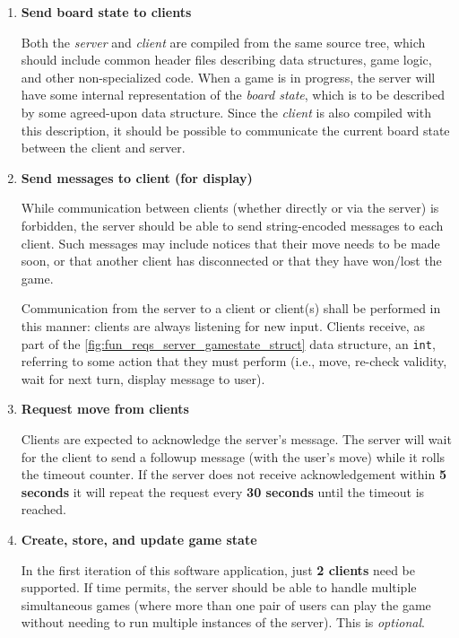 \documentclass[letterpaper]{article}
\begin{document}
\begin{enumerate}
    \item \textbf{Send board state to clients}
    
          Both the \emph{server} and \emph{client} are compiled
          from the same source tree, which should include common
          header files describing data structures, game logic,
          and other non-specialized code. When a game is in
          progress, the server will have some internal
          representation of the \emph{board state}, which is to
          be described by some agreed-upon data structure. Since
          the \emph{client} is also compiled with this
          description, it should be possible to communicate the
          current board state between the client and server.
          
    \item \textbf{Send messages to client (for display)}
    
          While communication between clients (whether directly
          or via the server) is forbidden, the server should be
          able to send string-encoded messages to each client.
          Such messages may include notices that their move
          needs to be made soon, or that another client has
          disconnected or that they have won/lost the game.
          
          Communication from the server to a client or client(s)
          shall be performed in this manner: clients are always
          listening for new input. Clients receive, as part of
          the \cref{fig:fun_reqs_server_gamestate_struct} data
          structure, an \texttt{int}, referring to some action
          that they must perform (i.e., move, re-check validity,
          wait for next turn, display message to user).
          
    \item \textbf{Request move from clients}
    
          Clients are expected to acknowledge the server's
          message. The server will wait for the client to
          send a followup message (with the user's move)
          while it rolls the timeout counter. If the server
          does not receive acknowledgement within
          \textbf{5 seconds} it will repeat the request every
          \textbf{30 seconds} until the timeout is reached.
          
    \item \textbf{Create, store, and update game state}
          
          In the first iteration of this software application,
          just \textbf{2 clients} need be supported. If time
          permits, the server should be able to handle multiple
          simultaneous games (where more than one pair of users
          can play the game without needing to run multiple
          instances of the server). This is \emph{optional}.
\end{enumerate}
\end{document}
